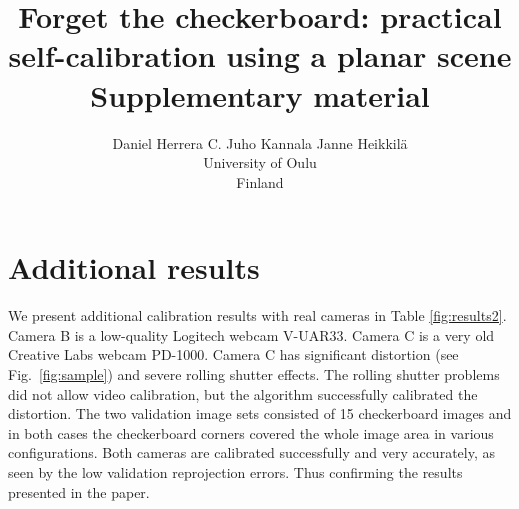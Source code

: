 \documentclass[10pt,twocolumn,letterpaper]{article}
\begin{document}
\title{Forget the checkerboard: practical self-calibration using a planar scene\\Supplementary material}

\author{Daniel Herrera C. \qquad Juho Kannala \qquad Janne Heikkil\"a\\
University of Oulu\\
Finland\\
}

\maketitle


\section{Additional results}
We present additional calibration results with real cameras in Table \ref{fig:results2}. Camera B is a low-quality Logitech webcam V-UAR33. Camera C is a very old Creative Labs webcam PD-1000. Camera C has significant distortion (see Fig.~\ref{fig:sample}) and severe rolling shutter effects. The rolling shutter problems did not allow video calibration, but the algorithm successfully calibrated the distortion. The two validation image sets consisted of 15 checkerboard images and in both cases the checkerboard corners covered the whole image area in various configurations. Both cameras are calibrated successfully and very accurately, as seen by the low validation reprojection errors. Thus confirming the results presented in the paper. 
\end{document}
